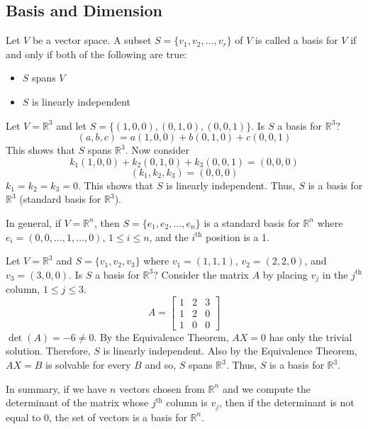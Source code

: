\documentclass[12pt]{article}
\begin{document}
\subsection{Basis and Dimension}
\begin{definition} Let $V$ be a vector space. A subset $S = \{v_1, v_2, \dots, v_r\}$ of $V$ is called a basis for $V$ if and only if both of the following are true: \begin{itemize} \item $S$ spans $V$ \item $S$ is linearly independent \end{itemize} \end{definition} 
\begin{example} Let $V = \mathbb{R}^3$ and let $S = \{(1, 0, 0), (0, 1, 0), (0, 0, 1)\}$. Is $S$ a basis for $\mathbb{R}^3$? \newline $$(a, b, c) = a(1, 0, 0) + b(0, 1, 0) + c(0, 0, 1) $$ This shows that $S$ spans $\mathbb{R}^3$. Now consider $$k_1(1, 0, 0) + k_2(0, 1, 0) + k_3(0, 0, 1) = (0, 0, 0)$$ $$(k_1, k_2, k_3) = (0, 0, 0)$$ $k_1 = k_2 = k_3 = 0$. This shows that $S$ is linearly independent. Thus, $S$ is a basis for $\mathbb{R}^3$ (standard basis for $\mathbb{R}^3$). \end{example} 
In general, if $V = \mathbb{R}^n$, then $S = \{e_1, e_2, \dots, e_n\}$ is a standard basis for $\mathbb{R}^n$ where $e_i = (0, 0, \dots, 1, \dots, 0)$, $1 \leq i \leq n$, and the $i^\text{th}$ position is a 1. 
\begin{example} Let $V = \mathbb{R}^3$ and $S = \{v_1, v_2, v_3\}$ where $v_1 = (1, 1, 1)$, $v_2 = (2, 2, 0)$, and $v_3 = (3, 0, 0)$. Is $S$ a basis for $\mathbb{R}^3$? \newline Consider the matrix $A$ by placing $v_j$ in the $j^\text{th}$ column, $1 \leq j \leq 3$. $$ A = \begin{bmatrix} 1 & 2 & 3 \\ 1 & 2 & 0 \\ 1 & 0 & 0 \end{bmatrix} $$ $\det(A) = -6 \neq 0$. By the Equivalence Theorem, $AX = 0$ has only the trivial solution. Therefore, $S$ is linearly independent. Also by the Equivalence Theorem, $AX = B$ is solvable for every $B$ and so, $S$ spans $\mathbb{R}^3$. Thus, $S$ is a basis for $\mathbb{R}^3$. \end{example} 
In summary, if we have $n$ vectors chosen from $\mathbb{R}^n$ and we compute the determinant of the matrix whose $j^\text{th}$ column is $v_j$, then if the determinant is not equal to 0, the set of vectors is a basis for $\mathbb{R}^n$. 
\end{document}
